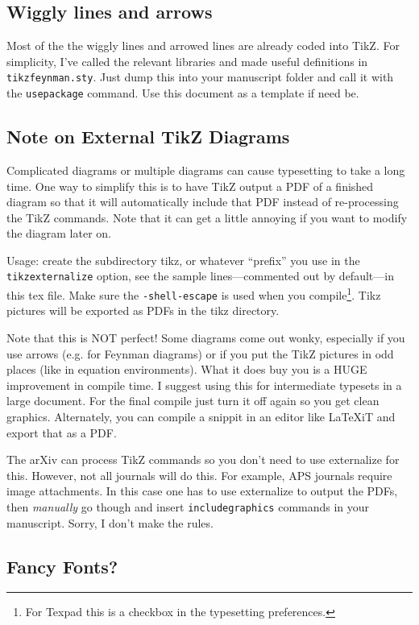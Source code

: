 \documentclass[12pt]{article}
\numberwithin{equation}{section}    %
\begin{document}
\subsection{Wiggly lines and arrows}

Most of the the wiggly lines and arrowed lines are already coded into TikZ. For simplicity, I've called the relevant libraries and made useful definitions in \texttt{tikzfeynman.sty}. Just dump this into your manuscript folder and call it with the \texttt{usepackage} command. Use this document as a template if need be.

\subsection{Note on External TikZ Diagrams}

Complicated diagrams or multiple diagrams can cause typesetting to take a long time. One way to simplify this is to have TikZ output a PDF of a finished diagram so that it will automatically include that PDF instead of re-processing the TikZ commands. Note that it can get a little annoying if you want to modify the diagram later on.

 Usage: create the subdirectory tikz, or whatever ``prefix'' you use in
 the \texttt{tikzexternalize} option, see the sample lines---commented out by default---in this tex file. Make sure the \texttt{-shell-escape} is used when you compile\footnote{For Texpad this is a checkbox in the typesetting preferences.}.  Tikz pictures will be exported as PDFs in the tikz directory.

Note that this is NOT perfect! Some diagrams come out wonky, especially if you
 use arrows (e.g. for Feynman diagrams) or if you put the TikZ pictures in
 odd places (like in equation environments). What it does buy you is a HUGE
 improvement in compile time. I suggest using this for intermediate 
 typesets in a large document. For the final compile just turn it off again
 so you get clean graphics. Alternately, you can compile a snippit in an editor like LaTeXiT and export that as a PDF. 
 
 The arXiv can process TikZ commands so you don't need to use externalize for this. However, not all journals will do this. For example, APS journals require image attachments. In this case one has to use externalize to output the PDFs, then \emph{manually} go though and insert \texttt{includegraphics} commands in your manuscript. Sorry, I don't make the rules.
 

\subsection{Fancy Fonts?}
\end{document}
